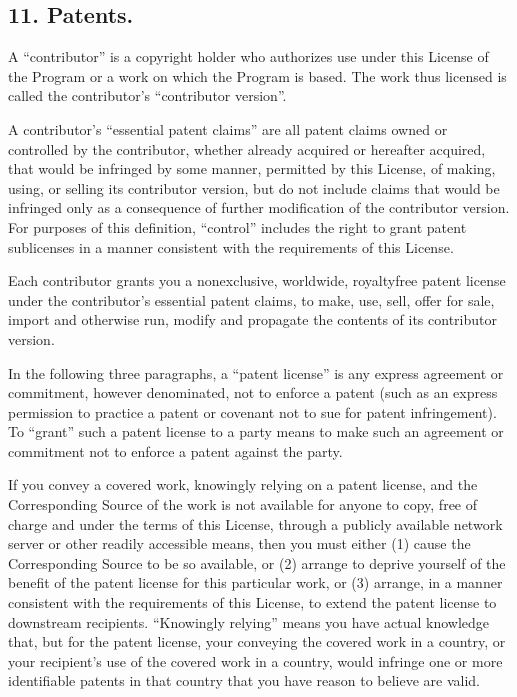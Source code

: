 \documentclass[letterpaper,10pt,english]{sphinxmanual}
\begin{document}
\subsection{11. Patents.}
\label{\detokenize{license:patents}}
\sphinxAtStartPar
A “contributor” is a copyright holder who authorizes use under this
License of the Program or a work on which the Program is based.  The
work thus licensed is called the contributor’s “contributor version”.

\sphinxAtStartPar
A contributor’s “essential patent claims” are all patent claims
owned or controlled by the contributor, whether already acquired or
hereafter acquired, that would be infringed by some manner, permitted
by this License, of making, using, or selling its contributor version,
but do not include claims that would be infringed only as a
consequence of further modification of the contributor version.  For
purposes of this definition, “control” includes the right to grant
patent sublicenses in a manner consistent with the requirements of
this License.

\sphinxAtStartPar
Each contributor grants you a non\sphinxhyphen{}exclusive, worldwide, royalty\sphinxhyphen{}free
patent license under the contributor’s essential patent claims, to
make, use, sell, offer for sale, import and otherwise run, modify and
propagate the contents of its contributor version.

\sphinxAtStartPar
In the following three paragraphs, a “patent license” is any express
agreement or commitment, however denominated, not to enforce a patent
(such as an express permission to practice a patent or covenant not to
sue for patent infringement).  To “grant” such a patent license to a
party means to make such an agreement or commitment not to enforce a
patent against the party.

\sphinxAtStartPar
If you convey a covered work, knowingly relying on a patent license,
and the Corresponding Source of the work is not available for anyone
to copy, free of charge and under the terms of this License, through a
publicly available network server or other readily accessible means,
then you must either (1) cause the Corresponding Source to be so
available, or (2) arrange to deprive yourself of the benefit of the
patent license for this particular work, or (3) arrange, in a manner
consistent with the requirements of this License, to extend the patent
license to downstream recipients.  “Knowingly relying” means you have
actual knowledge that, but for the patent license, your conveying the
covered work in a country, or your recipient’s use of the covered work
in a country, would infringe one or more identifiable patents in that
country that you have reason to believe are valid.
\end{document}
